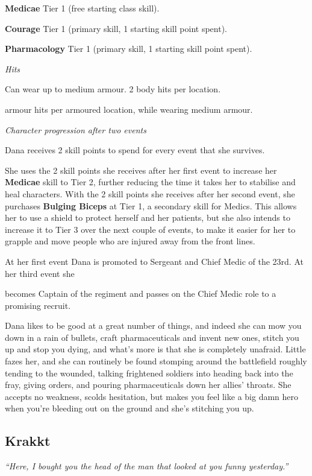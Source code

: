 \documentclass{scrbook}
\begin{document}
\textbf{Medicae} Tier 1 (free starting class skill).

\textbf{Courage} Tier 1 (primary skill, 1 starting skill point spent).

\textbf{Pharmacology} Tier 1 (primary skill, 1 starting skill point spent).

\textit{Hits}

Can wear up to medium armour. 2 body hits per location.

armour hits per armoured location, while wearing medium armour.

\textit{Character progression after two events}

Dana receives 2 skill points to spend for every event that she survives.

She uses the 2 skill points she receives after her first event to increase her \textbf{Medicae} skill to Tier 2, further reducing the time it takes her to stabilise and heal characters. With the 2 skill points she receives after her second event, she purchases \textbf{Bulging Biceps} at Tier 1, a secondary skill for Medics. This allows her to use a shield to protect herself and her patients, but she also intends to increase it to Tier 3 over the next couple of events, to make it easier for her to grapple and move people who are injured away from the front lines.

At her first event Dana is promoted to Sergeant and Chief Medic of the 23rd. At her third event she

becomes Captain of the regiment and passes on the Chief Medic role to a promising recruit.

Dana likes to be good at a great number of things, and indeed she can mow you down in a rain of bullets, craft pharmaceuticals and invent new ones, stitch you up and stop you dying, and what's more is that she is completely unafraid. Little fazes her, and she can routinely be found stomping around the battlefield roughly tending to the wounded, talking frightened soldiers into heading back into the fray, giving orders, and pouring pharmaceuticals down her allies' throats. She accepts no weakness, scolds hesitation, but makes you feel like a big damn hero when you're bleeding out on the ground and she's stitching you up.

\subsection{Krakkt}

\textit{``Here, I bought you the head of the man that looked at you funny yesterday.''}
\end{document}
